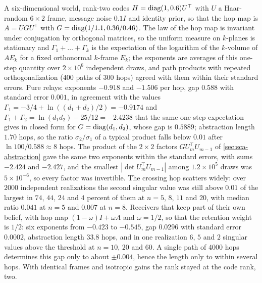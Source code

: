 \begin{numcheck}\label{chk:sca-lyapunov}
A six-dimensional world, rank-two codes $H=\operatorname{diag}(1,0.6)U^\top$ with $U$ a Haar-random $6\times2$ frame, message noise $0.1I$ and identity prior, so that the hop map is $A=UGU^\top$ with $G=\operatorname{diag}(1/1.1,0.36/0.46)$. The law of the hop map is invariant under conjugation by orthogonal matrices, so the uniform measure on $k$-planes is stationary and $\Gamma_1+\dots+\Gamma_k$ is the expectation of the logarithm of the $k$-volume of $AE_k$ for a fixed orthonormal $k$-frame $E_k$; the exponents are averages of this one-step quantity over $2\times10^6$ independent draws, and path products with repeated orthogonalization ($400$ paths of $300$ hops) agreed with them within their standard errors. Pure relays: exponents $-0.918$ and $-1.506$ per hop, gap $0.588$ with standard error $0.001$, in agreement with the values $\Gamma_1=-3/4+\ln((d_1+d_2)/2)=-0.9174$ and $\Gamma_1+\Gamma_2=\ln(d_1d_2)-25/12=-2.4238$ that the same one-step expectation gives in closed form for $G=\operatorname{diag}(d_1,d_2)$, whose gap is $0.5889$; abstraction length $1.70$ hops, so the ratio $\sigma_2/\sigma_1$ of a typical product falls below $0.01$ after $\ln100/0.588\approx8$ hops. The product of the $2\times2$ factors $GU_m^\top U_{m-1}$ of \cref{sec:sca-abstraction} gave the same two exponents within the standard errors, with sums $-2.424$ and $-2.427$, and the smallest $|\det U_m^\top U_{m-1}|$ among $1.2\times10^5$ draws was $5\times10^{-6}$, so every factor was invertible. The crossing hop scatters widely: over $2000$ independent realizations the second singular value was still above $0.01$ of the largest in $74$, $44$, $24$ and $4$ percent of them at $n=5$, $8$, $11$ and $20$, with median ratio $0.041$ at $n=5$ and $0.007$ at $n=8$. Receivers that keep part of their own belief, with hop map $(1-\omega)I+\omega A$ and $\omega=1/2$, so that the retention weight is $1/2$: six exponents from $-0.423$ to $-0.545$, gap $0.0296$ with standard error $0.0002$, abstraction length $33.8$ hops, and in one realization $6$, $5$ and $2$ singular values above the threshold at $n=10$, $20$ and $60$. A single path of $4000$ hops determines this gap only to about $\pm0.004$, hence the length only to within several hops. With identical frames and isotropic gains the rank stayed at the code rank, two.
\end{numcheck}
